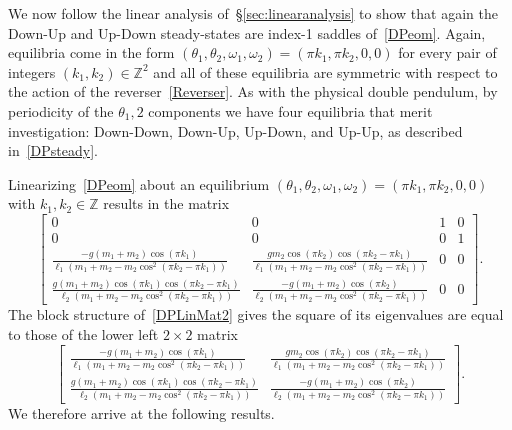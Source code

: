\documentclass[11pt]{article}
\numberwithin{equation}{section}
\theoremstyle{plain}
\begin{document}
We now follow the linear analysis of~\S\ref{sec:linearanalysis} to show that again the Down-Up and Up-Down steady-states are index-1 saddles of~\eqref{DPeom}. Again, equilibria come in the form $(\theta_1,\theta_2,\omega_1,\omega_2) = (\pi k_1,\pi k_2,0,0)$ for every pair of integers $(k_1,k_2) \in \mathbb{Z}^2$ and all of these equilibria are symmetric with respect to the action of the reverser~\eqref{Reverser}. As with the physical double pendulum, by periodicity of the $\theta_1,2$ components we have four equilibria that merit investigation: Down-Down, Down-Up, Up-Down, and Up-Up, as described in~\eqref{DPsteady}. 

Linearizing~\eqref{DPeom} about an equilibrium $(\theta_1,\theta_2,\omega_1,\omega_2) = (\pi k_1,\pi k_2,0,0)$ with $k_1,k_2\in\mathbb{Z}$ results in the matrix
\begin{equation}\label{DPLinMat2}
	\begin{bmatrix}
		0 & 0 & 1 & 0 \\
		0 & 0 & 0 & 1 \\
		\frac{-g(m_1 + m_2)\cos(\pi k_1)}{\ell_1(m_1+m_2-m_2\cos^2(\pi k_2 - \pi k_1))} & \frac{gm_2 \cos(\pi k_2)\cos(\pi k_2 - \pi k_1)}{\ell_1(m_1+m_2-m_2\cos^2(\pi k_2 - \pi k_1))} & 0 & 0 \\
		\frac{g(m_1 + m_2)\cos(\pi k_1)\cos(\pi k_2 - \pi k_1)}{\ell_2(m_1+m_2 - m_2\cos^2(\pi k_2 - \pi k_1))} & \frac{-g(m_1 + m_2) \cos(\pi k_2)}{\ell_2(m_1+m_2 - m_2\cos^2(\pi k_2 - \pi k_1))} & 0 & 0
	\end{bmatrix}.
\end{equation} 
The block structure of~\eqref{DPLinMat2} gives the square of its eigenvalues are equal to those of the lower left $2\times 2$ matrix
\begin{equation}\label{MiniMat2}
	\begin{bmatrix}
		\frac{-g(m_1 + m_2)\cos(\pi k_1)}{\ell_1(m_1+m_2-m_2\cos^2(\pi k_2 - \pi k_1))} & \frac{gm_2 \cos(\pi k_2)\cos(\pi k_2 - \pi k_1)}{\ell_1(m_1+m_2-m_2\cos^2(\pi k_2 - \pi k_1))} \\
		\frac{g(m_1 + m_2)\cos(\pi k_1)\cos(\pi k_2 - \pi k_1)}{\ell_2(m_1+m_2 - m_2\cos^2(\pi k_2 - \pi k_1))} & \frac{-g(m_1 + m_2) \cos(\pi k_2)}{\ell_2(m_1+m_2 - m_2\cos^2(\pi k_2 - \pi k_1))} 
	\end{bmatrix}.
\end{equation}
We therefore arrive at the following results.\\
\end{document}
